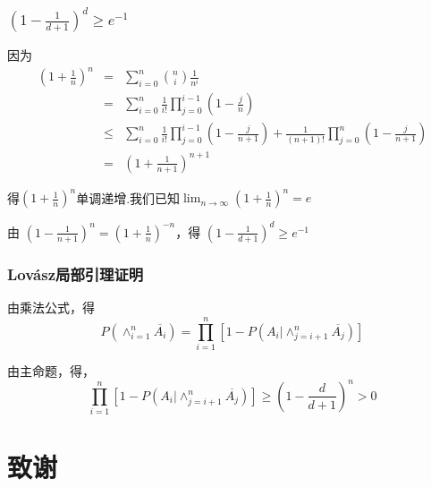 \documentclass[AutoFakeBold]{beamer}
\begin{document}
{\begin{frame}
    \end{frame}

    \begin{frame}
        \frametitle{$(1 - \frac{1}{d+1})^d\ge e^{-1}$}
        因为
        \begin{eqnarray*} 
        (1 + \frac{1}{n})^n &=& \sum_{i=0}^{n}\binom{n}{i}\frac{1}{n^i}\\&=& \sum_{i=0}^{n}\frac{1}{i!} \prod_{j=0}^{i-1}(1 - \frac{j}{n}) \\  &\le&\sum_{i=0}^{n} \frac{1}{i!}\prod_{j=0}^{i-1}(1 - \frac{j}{n+1}) + \frac{1}{(n+1)!}\prod_{j=0}^{n}(1-\frac{j}{n+1})\\ &=& (1+\frac{1}{n+1})^{n+1}
        \end{eqnarray*}

        得$(1 + \frac{1}{n})^n$单调递增.我们已知$\lim_{n \to \infty}(1 + \frac{1}{n})^n = e$

        由 $(1 - \frac{1}{n+1})^n = (1+\frac{1}{n})^{-n}$，得 $(1 - \frac{1}{d+1})^d\ge e^{-1}$
    \end{frame}

    \begin{frame}
        \frametitle{Lovász局部引理证明}
    
        由乘法公式，得
        $$P(\wedge_{i=1}^{n}\overline{A_i}) = \prod_{i=1}^{n}[1 -  P(A_i|\wedge_{j=i+1}^{n}\overline{A_j})]$$

        由主命题，得，$$\prod_{i=1}^{n}[1 -  P(A_i|\wedge_{j=i+1}^{n}\overline{A_j})] \ge (1 - \frac{d}{d+1})^n>0$$

    
    \end{frame}
    
    \section*{致谢}

}
\end{document}
